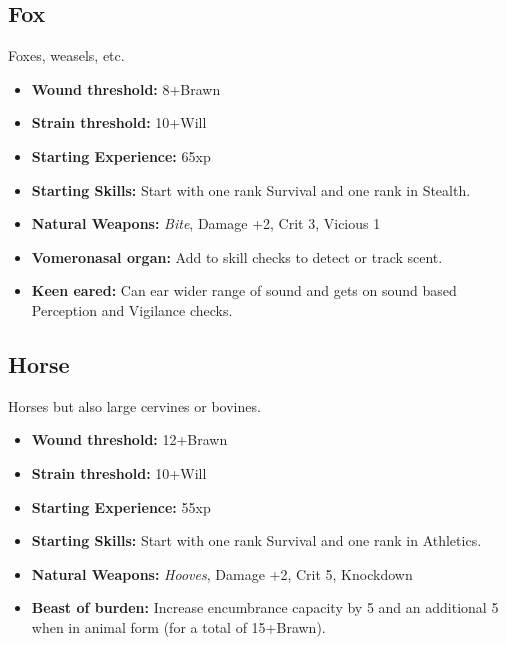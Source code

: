 \documentclass{book}
\begin{document}
\begin{multicols}{2}
	\subsection{Fox}	
	Foxes, weasels, etc.
	
	\begin{itemize}
		\item \textbf{Wound threshold:} 8+Brawn
		\item \textbf{Strain threshold:} 10+Will
		\item \textbf{Starting Experience:} 65xp
		\item \textbf{Starting Skills:} Start with one rank Survival and one rank in Stealth.
		\item \textbf{Natural Weapons:} \textit{Bite}, Damage +2, Crit 3, Vicious 1
		\item \textbf{Vomeronasal organ:} Add \BoostDie \BoostDie to skill checks to detect or track scent.
		\item \textbf{Keen eared:} Can ear wider range of sound and gets \BoostDie on sound based Perception and Vigilance checks.	
	\end{itemize}
	
	\subsection{Horse}
	Horses but also large cervines or bovines.
	
	\begin{itemize}
		\item \textbf{Wound threshold:} 12+Brawn
		\item \textbf{Strain threshold:} 10+Will
		\item \textbf{Starting Experience:} 55xp
		\item \textbf{Starting Skills:} Start with one rank Survival and one rank in Athletics.
		\item \textbf{Natural Weapons:} \textit{Hooves}, Damage +2, Crit 5, Knockdown
		\item \textbf{Beast of burden:} Increase encumbrance capacity by 5 and an additional 5 when in animal form (for a total of 15+Brawn).
	\end{itemize}
	
\end{multicols}
\end{document}
